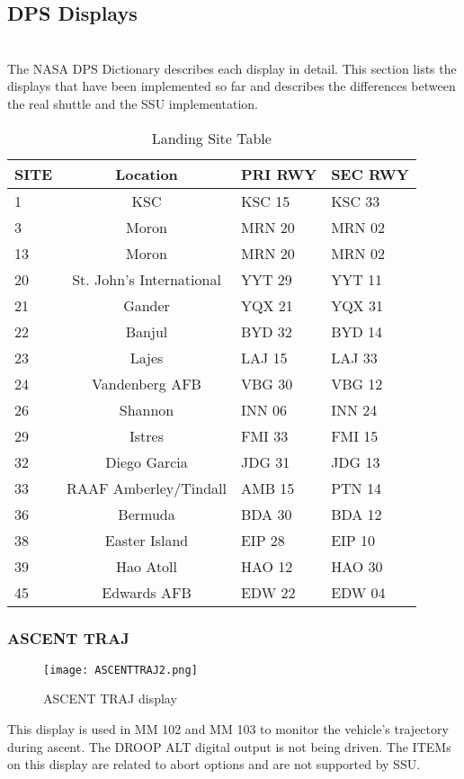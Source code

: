 \documentclass[Space_Shuttle_Ultra_Manual.tex]{subfiles}
\begin{document}
\subsection{DPS Displays}
\begin{multicols*}{2}
\renewcommand{\cfttoctitlefont}{\bf}
\localtableofcontents
\label{sec:dps-displays}
\noindent
\\
The NASA DPS Dictionary describes each display in detail. This section lists the displays that have been implemented so far and describes the differences between the real shuttle and the SSU implementation.

\begin{table*}[tb]
  \centering
  \begin{tabular}{l | c l l}
    \textbf{SITE} & \textbf{Location} & \textbf{PRI RWY} & \textbf{SEC RWY} \\
    \hline
    1 & KSC & KSC 15 & KSC 33 \\
    3 & Moron & MRN 20 & MRN 02 \\
    13 & Moron & MRN 20 & MRN 02 \\
    20 & St. John's International & YYT 29 & YYT 11 \\
		21 & Gander & YQX 21 & YQX 31 \\
		22 & Banjul & BYD 32 & BYD 14 \\
    23 & Lajes & LAJ 15 & LAJ 33 \\
    24 & Vandenberg AFB & VBG 30 & VBG 12 \\
		26 & Shannon & INN 06 & INN 24 \\
    29 & Istres & FMI 33 & FMI 15 \\
    32 & Diego Garcia & JDG 31 & JDG 13 \\
    33 & RAAF Amberley/Tindall & AMB 15 & PTN 14 \\
    36 & Bermuda & BDA 30 & BDA 12 \\
    38 & Easter Island & EIP 28 & EIP 10 \\
    39 & Hao Atoll & HAO 12 & HAO 30 \\
    45 & Edwards AFB & EDW 22 & EDW 04
  \end{tabular}
  \caption{Landing Site Table}
  \label{tab:LandingSites}
\end{table*}

\subsubsection{ASCENT TRAJ}
\begin{figure}[H]
  \texttt{[image: ASCENTTRAJ2.png]}
  \caption{ASCENT TRAJ display}
  \label{fig:ASCENT_TRAJ}
\end{figure}
This display is used in MM 102 and MM 103 to monitor the vehicle's trajectory during ascent. The DROOP ALT digital output is not being driven. The ITEMs on this display are related to abort options and are not supported by SSU.


\end{multicols*}
\end{document}
